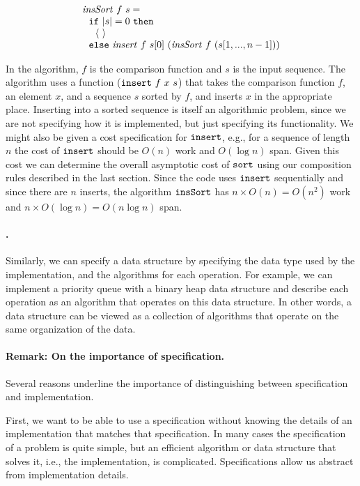 \[
\begin{array}{l}
\mathit{insSort}~f~s =
\\ 
~~\texttt{if}~|s| = 0~\texttt{then} 
\\
~~~~\left\langle\,  \,\right\rangle
\\
~~\texttt{else}~\mathit{insert}~f~s[0]~(\mathit{insSort}~f~(s[1,...,n-1]))
\end{array}
\]


In the algorithm, $f$ is the comparison function and $s$ is the input
sequence. %
The algorithm uses a function ($\texttt{insert}~f~x~s$) that
takes the comparison function $f$, an element $x$, and a sequence $s$
sorted by $f$, and inserts $x$ in the appropriate place.  
%
Inserting into a sorted sequence is itself an algorithmic problem,
since we are not specifying how it is implemented, but just specifying
its functionality.  
%
We might also be given a cost specification for $\texttt{insert}$, e.g., for
a sequence of length $n$ the cost of $\texttt{insert}$ should be $O(n)$
work and $O(\log n)$ span.  
%
Given this cost we can determine the overall asymptotic cost of
$\texttt{sort}$ using our composition rules described in the last section.
%
Since the code uses $\texttt{insert}$ sequentially and since there are $n$
inserts, the algorithm $\texttt{insSort}$ has $n \times O(n) =
O(n^2)$ work and $n \times O(\log n) = O(n \log n)$ span.

\paragraph{.}
Similarly, we can specify a data structure by specifying the data type
used by the implementation, and the algorithms for each operation.
%
For example, we can implement a priority queue with a binary heap data
structure and describe each operation as an algorithm that operates on
this data structure.  In other words, a data structure can be viewed
as a collection of algorithms that operate on the same organization
of the data.

\paragraph{Remark: On the importance of specification.}
Several reasons underline the importance of distinguishing between
specification and implementation.  

First, we want to be able to use a specification without knowing the
details of an implementation that matches that specification.
%
In many cases the specification of a problem is quite simple, but an
efficient algorithm or data structure that solves it, i.e., the
implementation, is complicated.  
%
Specifications allow us abstract from implementation details.
%

